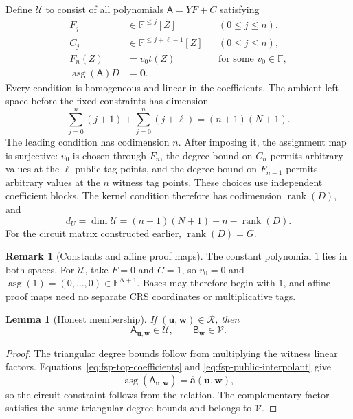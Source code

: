 \documentclass[11pt]{article}
\newtheorem{lemma}[theorem]{Lemma}
\theoremstyle{definition}
\newtheorem{remark}[theorem]{Remark}
\newcommand{\F}{\mathbb F}
\newcommand{\cR}{\mathcal R}
\newcommand{\cU}{\mathcal U}
\newcommand{\cV}{\mathcal V}
\newcommand{\asg}{\operatorname{asg}}
\begin{document}
Define $\cU$ to consist of all polynomials $\mathsf A=YF+C$ satisfying
\begin{align}
  F_j&\in\F^{\le j}[Z] &&(0\le j\le n),
  \label{eq:fsp-U-F-degree}\\
  C_j&\in\F^{\le j+\ell-1}[Z] &&(0\le j\le n),
  \label{eq:fsp-U-C-degree}\\
  F_n(Z)&=v_0t(Z) &&\text{for some }v_0\in\F,
  \label{eq:fsp-U-leading}\\
  \asg(\mathsf A)D&=\mathbf 0.
  \label{eq:fsp-U-circuit}
\end{align}
Every condition is homogeneous and linear in the coefficients.  The ambient
left space before the fixed constraints has dimension
\begin{equation}
  \sum_{j=0}^{n}(j+1)+\sum_{j=0}^{n}(j+\ell)
  =(n+1)(N+1).
  \label{eq:fsp-left-ambient-dimension}
\end{equation}
The leading condition has codimension $n$.  After imposing it, the
assignment map is surjective: $v_0$ is chosen through $F_n$, the degree bound
on $C_n$ permits arbitrary values at the $\ell$ public tag points, and the
degree bound on $F_{n-1}$ permits arbitrary values at the $n$ witness tag
points.  These choices use independent coefficient blocks.  The kernel
condition therefore has codimension $\operatorname{rank}(D)$, and
\begin{equation}
  d_U=\dim\cU
  =(n+1)(N+1)-n-\operatorname{rank}(D).
  \label{eq:fsp-left-dimension}
\end{equation}
For the circuit matrix constructed earlier, $\operatorname{rank}(D)=G$.

\begin{remark}[Constants and affine proof maps]
The constant polynomial $1$ lies in both spaces.  For $\cU$, take $F=0$ and
$C=1$, so $v_0=0$ and
$\asg(1)=(0,\ldots,0)\in\F^{N+1}$.  Bases may therefore begin
with $1$, and affine proof maps need no separate CRS coordinates or
multiplicative tags.
\end{remark}

\begin{lemma}[Honest membership]
\label{lem:fsp-honest-membership}
If $(\mathbf u,\mathbf w)\in\cR$, then
\[
  \mathsf A_{\mathbf u,\mathbf w}\in\cU,
  \qquad
  \mathsf B_{\mathbf w}\in\cV.
\]
\end{lemma}

\begin{proof}
The triangular degree bounds follow from multiplying the witness linear
factors.  Equations~\eqref{eq:fsp-top-coefficients} and
\eqref{eq:fsp-public-interpolant} give
\[
  \asg(\mathsf A_{\mathbf u,\mathbf w})
  =\overline{\mathbf a}(\mathbf u,\mathbf w),
\]
so the circuit constraint follows from the relation.  The complementary
factor satisfies the same triangular degree bounds and belongs to $\cV$.
\end{proof}
\end{document}
